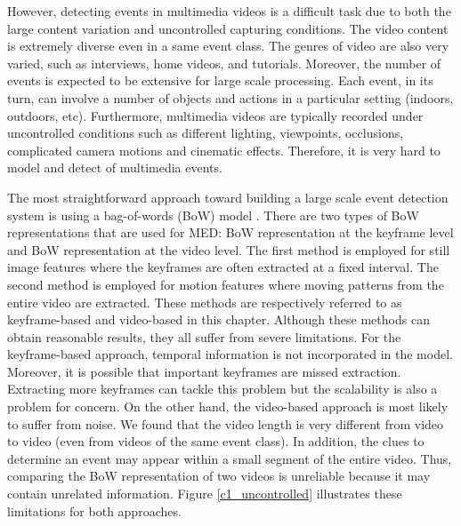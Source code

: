 However, detecting events in multimedia videos is a difficult task due to both the large content variation and uncontrolled capturing conditions. The video content is extremely diverse even in a same event class. The genres of video are also very varied, such as interviews, home videos, and tutorials. Moreover, the number of events is expected to be extensive for large scale processing. Each event, in its turn, can involve a number of objects and actions in a particular setting (indoors, outdoors, etc). Furthermore, multimedia videos are typically recorded under uncontrolled conditions such as different lighting, viewpoints, occlusions, complicated camera motions and cinematic effects. Therefore, it is very hard to model and detect of multimedia events.

The most straightforward approach toward building a large scale event detection system is using a bag-of-words (BoW) model \cite{Csurka04visualcategorization}. There are two types of BoW representations that are used for MED: BoW representation at the keyframe level and BoW representation at the video level. The first method is employed for still image features where the keyframes are often extracted at a fixed interval. The second method is employed for motion features where moving patterns from the entire video are extracted. These methods are respectively referred to as keyframe-based \cite{trecvid10:IBM,trecvid10:cuucf,DBLP:conf/trecvid/MatsuoN10} and video-based \cite{trecvid10:IBM,trecvid10:cuucf} in this chapter. Although these methods can obtain reasonable results, they all suffer from severe limitations. For the keyframe-based approach, temporal information is not incorporated in the model. Moreover, it is possible that important keyframes are missed extraction. Extracting more keyframes can tackle this problem but the scalability is also a problem for concern. On the other hand, the video-based approach is most likely to suffer from noise. We found that the video length is very different from video to video (even from videos of the same event class). In addition, the clues to determine an event may appear within a small segment of the entire video. Thus, comparing the BoW representation of two videos is unreliable because it may contain unrelated information. Figure \ref{c1_uncontrolled} illustrates these limitations for both approaches. 

